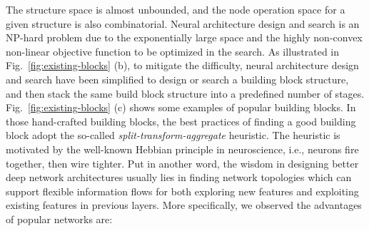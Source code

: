 \documentclass[10pt,twocolumn,letterpaper]{article}
\begin{document}
The structure space is almost unbounded, and the node operation space for a given structure is also combinatorial. Neural architecture design and search is an NP-hard problem due to the exponentially large space and the highly non-convex non-linear objective function to be optimized in the search. As illustrated in Fig.~\ref{fig:existing-blocks} (b), to mitigate the difficulty, neural architecture design and search have been simplified to design or search a building block structure, and then stack the same build block structure into a predefined number of stages. Fig.~\ref{fig:existing-blocks} (c) shows some examples of popular building blocks. In those hand-crafted building blocks, the best practices of finding a good building block adopt the so-called \emph{split-transform-aggregate} heuristic. The heuristic is motivated by the well-known Hebbian principle in neuroscience, i.e., neurons fire together, then wire tighter. Put in another word, the wisdom in designing better deep network architectures usually lies in finding network topologies which can support flexible information flows for both exploring new features and exploiting existing features in previous layers. More specifically, we observed the advantages of popular networks are:
\end{document}
